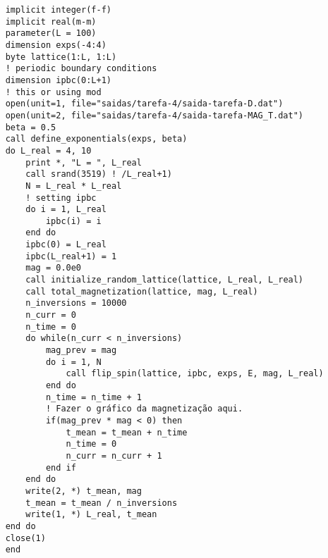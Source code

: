 \begin{verbatim}
    implicit integer(f-f)
    implicit real(m-m)
    parameter(L = 100)
    dimension exps(-4:4)
    byte lattice(1:L, 1:L)
    ! periodic boundary conditions
    dimension ipbc(0:L+1)
    ! this or using mod
    open(unit=1, file="saidas/tarefa-4/saida-tarefa-D.dat")
    open(unit=2, file="saidas/tarefa-4/saida-tarefa-MAG_T.dat")
    beta = 0.5
    call define_exponentials(exps, beta)
    do L_real = 4, 10
        print *, "L = ", L_real 
        call srand(3519) ! /L_real+1)
        N = L_real * L_real
        ! setting ipbc
        do i = 1, L_real
            ipbc(i) = i
        end do  
        ipbc(0) = L_real
        ipbc(L_real+1) = 1
        mag = 0.0e0
        call initialize_random_lattice(lattice, L_real, L_real)
        call total_magnetization(lattice, mag, L_real)
        n_inversions = 10000
        n_curr = 0
        n_time = 0
        do while(n_curr < n_inversions) 
            mag_prev = mag
            do i = 1, N
                call flip_spin(lattice, ipbc, exps, E, mag, L_real)
            end do
            n_time = n_time + 1
            ! Fazer o gráfico da magnetização aqui.
            if(mag_prev * mag < 0) then 
                t_mean = t_mean + n_time
                n_time = 0
                n_curr = n_curr + 1
            end if
        end do
        write(2, *) t_mean, mag
        t_mean = t_mean / n_inversions
        write(1, *) L_real, t_mean
    end do
    close(1)
    end
\end{verbatim}